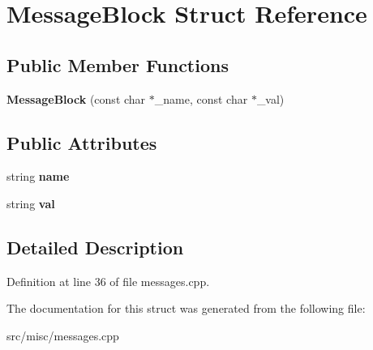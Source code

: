 \hypertarget{structMessageBlock}{\section{Message\-Block Struct Reference}
\label{structMessageBlock}
}
\subsection*{Public Member Functions}
\begin{DoxyCompactItemize}
\item 
\hypertarget{structMessageBlock_ab63c103393dc616700f200ea944f735b}{{\bfseries Message\-Block} (const char $\ast$\-\_\-name, const char $\ast$\-\_\-val)}\label{structMessageBlock_ab63c103393dc616700f200ea944f735b}

\end{DoxyCompactItemize}
\subsection*{Public Attributes}
\begin{DoxyCompactItemize}
\item 
\hypertarget{structMessageBlock_a76df1480350acb8bb8f039fa62e6358a}{string {\bfseries name}}\label{structMessageBlock_a76df1480350acb8bb8f039fa62e6358a}

\item 
\hypertarget{structMessageBlock_aa878ba9c76b4cb8cadc438d206f94ca2}{string {\bfseries val}}\label{structMessageBlock_aa878ba9c76b4cb8cadc438d206f94ca2}

\end{DoxyCompactItemize}


\subsection{Detailed Description}


Definition at line 36 of file messages.\-cpp.



The documentation for this struct was generated from the following file\-:\begin{DoxyCompactItemize}
\item 
src/misc/messages.\-cpp\end{DoxyCompactItemize}
